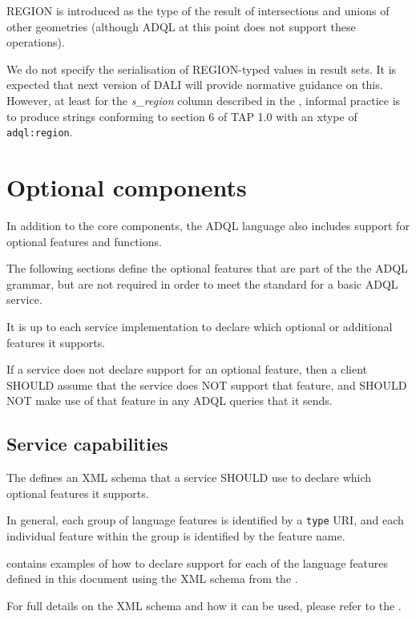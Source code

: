\documentclass[11pt,a4paper]{ivoa}
\begin{document}
REGION is introduced as the type of the result of intersections and
unions of other geometries (although ADQL at this point does not support
these operations).

We do not specify the serialisation of REGION-typed values in result
sets.  It is expected that next version of DALI will provide normative
guidance on this.  However, at least for the \textit{s\_region}
column described in the \ObsCoreSpec,
informal practice is to produce strings conforming to section 6
of TAP 1.0 \citep{2010ivoa.spec.0327D} with an xtype of
\texttt{adql:region}.

\clearpage
\section{Optional components}
\label{sec:optional}

In addition to the core components, the ADQL language also includes support
for optional features and functions.

The following sections define the optional features that are part of the
the ADQL grammar, but are not required in order to meet the standard for
a basic ADQL service.

It is up to each service implementation to declare which optional or
additional features it supports.

If a service does not declare support for an optional feature,
then a client SHOULD assume that the service does NOT support
that feature, and SHOULD NOT make use of that feature in any
ADQL queries that it sends.

\subsection{Service capabilities}
\label{sec:capabilities}

The \TAPRegSpec defines an XML schema that a service SHOULD
use to declare which optional features it supports.

In general, each group of language features is identified by a \verb:type:
URI, and each individual feature within the group is identified by the
feature name.

 contains examples of how to declare support
for each of the language features defined in this document using the
XML schema from the \TAPRegSpec.

For full details on the XML schema and how it can be used, please refer to
the \TAPRegSpec.
\end{document}
